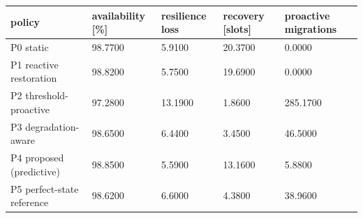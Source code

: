 \begin{tabular}{lllll}
\toprule
policy & availability [\%] & resilience loss & recovery [slots] & proactive migrations \\
\midrule
P0 static & 98.7700 & 5.9100 & 20.3700 & 0.0000 \\
P1 reactive restoration & 98.8200 & 5.7500 & 19.6900 & 0.0000 \\
P2 threshold-proactive & 97.2800 & 13.1900 & 1.8600 & 285.1700 \\
P3 degradation-aware & 98.6500 & 6.4400 & 3.4500 & 46.5000 \\
P4 proposed (predictive) & 98.8500 & 5.5900 & 13.1600 & 5.8800 \\
P5 perfect-state reference & 98.6200 & 6.6000 & 4.3800 & 38.9600 \\
\bottomrule
\end{tabular}
